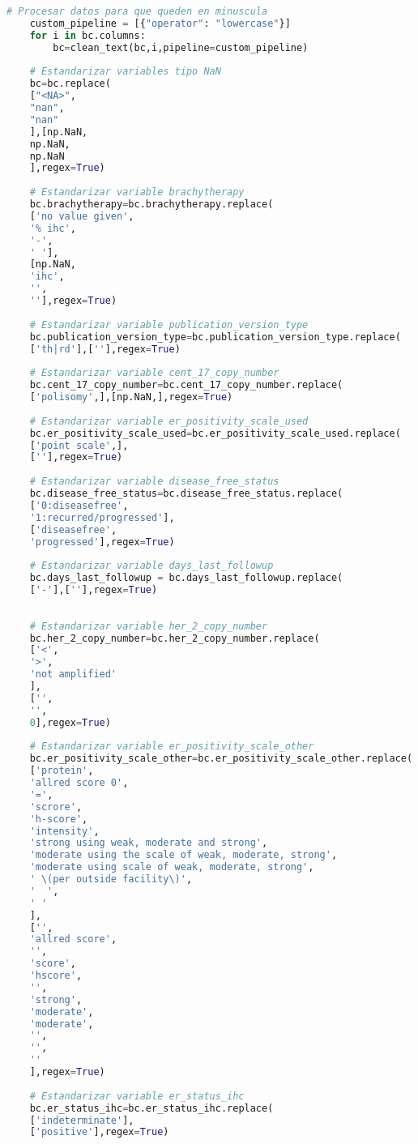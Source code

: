 \begin{lstlisting}[basicstyle=\scriptsize,language=Python, label=estandarizacion, caption=Estandarización de datos genómicos en Python.]
	# Procesar datos para que queden en minuscula
	custom_pipeline = [{"operator": "lowercase"}]
	for i in bc.columns:
		bc=clean_text(bc,i,pipeline=custom_pipeline)
		
	# Estandarizar variables tipo NaN
	bc=bc.replace(
	["<NA>",
	"nan",
	"nan"
	],[np.NaN,
	np.NaN,
	np.NaN
	],regex=True)
	
	# Estandarizar variable brachytherapy
	bc.brachytherapy=bc.brachytherapy.replace(
	['no value given',
	'% ihc',
	'-',
	' '],
	[np.NaN,
	'ihc',
	'',
	''],regex=True)
	
	# Estandarizar variable publication_version_type
	bc.publication_version_type=bc.publication_version_type.replace(
	['th|rd'],[''],regex=True)
	
	# Estandarizar variable cent_17_copy_number
	bc.cent_17_copy_number=bc.cent_17_copy_number.replace(
	['polisomy',],[np.NaN,],regex=True)
	
	# Estandarizar variable er_positivity_scale_used
	bc.er_positivity_scale_used=bc.er_positivity_scale_used.replace(
	['point scale',],
	[''],regex=True)
	
	# Estandarizar variable disease_free_status
	bc.disease_free_status=bc.disease_free_status.replace(
	['0:diseasefree',
	'1:recurred/progressed'],
	['diseasefree',
	'progressed'],regex=True)
	
	# Estandarizar variable days_last_followup
	bc.days_last_followup = bc.days_last_followup.replace(
	['-'],[''],regex=True)
	
	
	# Estandarizar variable her_2_copy_number
	bc.her_2_copy_number=bc.her_2_copy_number.replace(
	['<',
	'>',
	'not amplified'
	],
	['',
	'',
	0],regex=True)
	
	# Estandarizar variable er_positivity_scale_other
	bc.er_positivity_scale_other=bc.er_positivity_scale_other.replace(
	['protein',
	'allred score 0',
	'=',
	'scrore',
	'h-score',
	'intensity',
	'strong using weak, moderate and strong',
	'moderate using the scale of weak, moderate, strong',
	'moderate using scale of weak, moderate, strong',
	' \(per outside facility\)',
	'  ',
	' '
	],
	['',
	'allred score',
	'',
	'score',
	'hscore',
	'',
	'strong',
	'moderate',
	'moderate',
	'',
	'',
	''
	],regex=True)
	
	# Estandarizar variable er_status_ihc
	bc.er_status_ihc=bc.er_status_ihc.replace(
	['indeterminate'],
	['positive'],regex=True)
	

\end{lstlisting}
